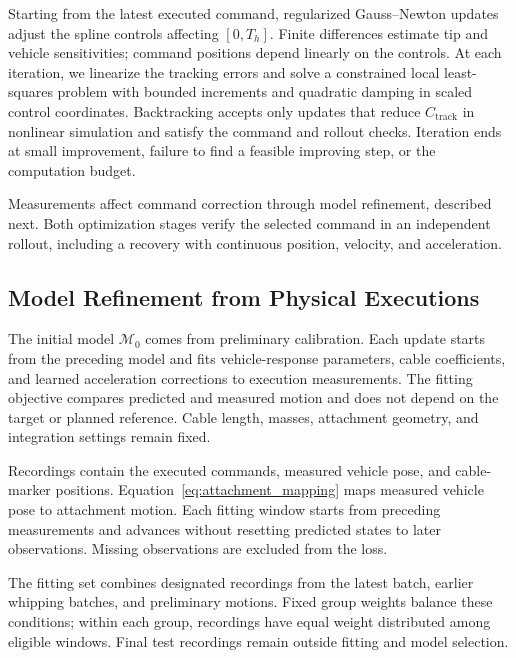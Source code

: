 \documentclass[letterpaper, 10 pt, conference]{ieeeconf}
\begin{document}
Starting from the latest executed command, regularized
Gauss--Newton updates adjust the spline controls affecting
$[0,T_h]$. Finite differences estimate tip and vehicle sensitivities;
command positions depend linearly on the controls. At each iteration,
we linearize the tracking errors and solve a constrained local
least-squares problem with bounded increments and quadratic
damping in scaled control coordinates. Backtracking accepts only
updates that reduce $C_{\mathrm{track}}$ in nonlinear simulation
and satisfy the command and rollout checks. Iteration ends at
small improvement, failure to find a feasible improving step,
or the computation budget.

Measurements affect command correction through model refinement,
described next. Both optimization stages verify the selected command
in an independent rollout, including a recovery with continuous
position, velocity, and acceleration.

\subsection{Model Refinement from Physical Executions}
\label{subsec:model_refinement}

The initial model $\mathcal M_0$ comes from preliminary calibration.
Each update starts from the preceding model and fits vehicle-response
parameters, cable coefficients, and learned acceleration corrections
to execution measurements. The fitting objective compares predicted and measured motion and does not
depend on the target or planned reference. Cable length, masses,
attachment geometry, and integration settings remain fixed.

Recordings contain the executed commands, measured vehicle pose,
and cable-marker positions. Equation~\eqref{eq:attachment_mapping}
maps measured vehicle pose to attachment motion. Each fitting
window starts from preceding measurements and advances without
resetting predicted states to later observations. Missing
observations are excluded from the loss.

The fitting set combines designated recordings from the latest
batch, earlier whipping batches, and preliminary motions.
Fixed group weights balance these conditions; within each group,
recordings have equal weight distributed among eligible windows.
Final test recordings remain outside fitting and model selection.
\end{document}

